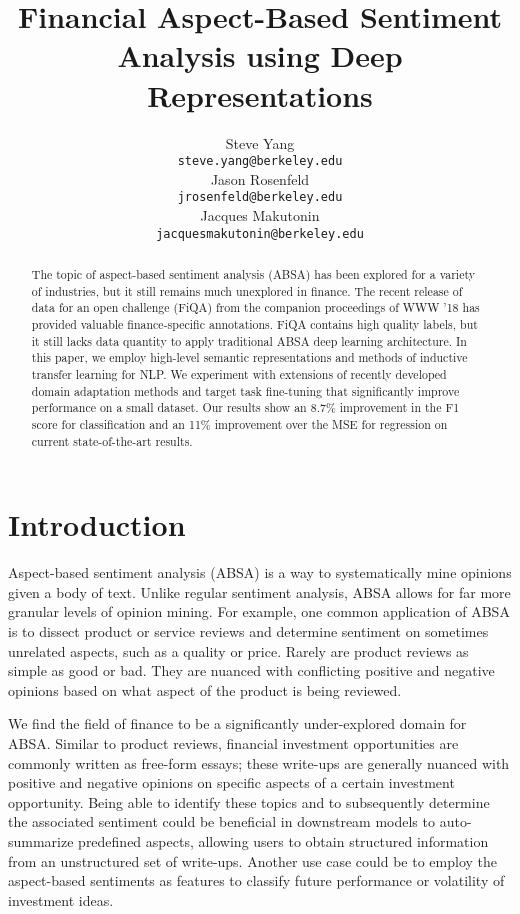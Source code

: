 \documentclass[11pt,a4paper]{article}
\title{Financial Aspect-Based Sentiment Analysis using Deep Representations}
\author{Steve Yang \\
  {\tt steve.yang@berkeley.edu} \\\AND
  Jason Rosenfeld \\
  {\tt jrosenfeld@berkeley.edu} \\\AND
  Jacques Makutonin \\
  {\tt jacquesmakutonin@berkeley.edu} \\}
\date{}
\begin{document}
\maketitle
\begin{abstract}
The topic of aspect-based sentiment analysis (ABSA) has been explored for a variety of industries, but it still remains much unexplored in finance. The recent release of data for an open challenge (FiQA) from the companion proceedings of WWW '18 has provided valuable finance-specific annotations. FiQA contains high quality labels, but it still lacks data quantity to apply traditional ABSA deep learning architecture. In this paper, we employ high-level semantic representations and methods of inductive transfer learning for NLP. We experiment with extensions of recently developed domain adaptation methods and target task fine-tuning that significantly improve performance on a small dataset. Our results show an 8.7\% improvement in the F1 score for classification and an 11\% improvement over the MSE for regression on current state-of-the-art results.
\end{abstract}

\section{Introduction}

Aspect-based sentiment analysis (ABSA) is a way to systematically mine opinions given a body of text. Unlike regular sentiment analysis, ABSA allows for far more granular levels of opinion mining. For example, one common application of ABSA is to dissect product or service reviews and determine sentiment on sometimes unrelated aspects, such as a quality or price. Rarely are product reviews as simple as good or bad. They are nuanced with conflicting positive and negative opinions based on what aspect of the product is being reviewed.

We find the field of finance to be a significantly under-explored domain for ABSA. Similar to product reviews, financial investment opportunities are commonly written as free-form essays; these write-ups are generally nuanced with positive and negative opinions on specific aspects of a certain investment opportunity. Being able to identify these topics and to subsequently determine the associated sentiment could be beneficial in downstream models to auto-summarize predefined aspects, allowing users to obtain structured information from an unstructured set of write-ups. Another use case could be to employ the aspect-based sentiments as features to classify future performance or volatility of investment ideas.
\end{document}
